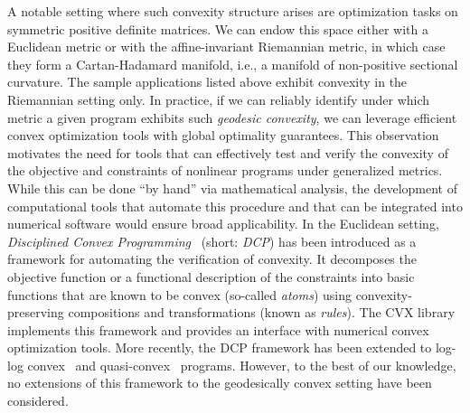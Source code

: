 \documentclass[twoside,11pt]{article}
\begin{document}
A notable setting where such convexity structure arises are optimization tasks on symmetric positive definite matrices. We can endow this space either with a Euclidean metric or with the affine-invariant Riemannian metric, in which case they form a Cartan-Hadamard manifold, i.e., a manifold of non-positive sectional curvature. The sample applications listed above exhibit convexity in the Riemannian setting only. In practice, if we can reliably identify under which metric a given program exhibits such \emph{geodesic convexity}, we can leverage efficient convex optimization tools with global optimality guarantees. This observation motivates the need for tools that can effectively test and verify the convexity of the objective and constraints of nonlinear programs under generalized metrics. While this can be done “by hand” via mathematical analysis, the development of computational tools that automate this procedure and that can be integrated into numerical software would ensure broad applicability. In the Euclidean setting, \emph{Disciplined Convex Programming}~\citep{grant2006disciplined} (short: \emph{DCP}) has been introduced as a framework for automating the verification of convexity. It decomposes the objective function or a functional description of the constraints into basic functions that are known to be convex (so-called \emph{atoms}) using convexity-preserving compositions and transformations (known as \emph{rules}). The CVX library~\citep{diamond2016cvxpy} implements this framework and provides an interface with numerical convex optimization tools. More recently, the DCP framework has been extended to log-log convex~\citep{dgp} and quasi-convex~\citep{dqp} programs. However, to the best of our knowledge, no extensions of this framework to the geodesically convex setting have been considered.
\end{document}
